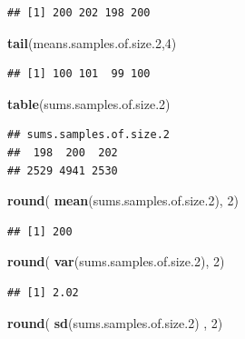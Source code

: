 \documentclass[]{book}
\newenvironment{Shaded}{\begin{snugshade}}{\end{snugshade}}
\newcommand{\DecValTok}[1]{\textcolor[rgb]{0.00,0.00,0.81}{#1}}
\newcommand{\FloatTok}[1]{\textcolor[rgb]{0.00,0.00,0.81}{#1}}
\newcommand{\KeywordTok}[1]{\textcolor[rgb]{0.13,0.29,0.53}{\textbf{#1}}}
\newcommand{\NormalTok}[1]{#1}
\begin{document}
\begin{verbatim}
## [1] 200 202 198 200
\end{verbatim}

\begin{Shaded}
\begin{Highlighting}[]
\KeywordTok{tail}\NormalTok{(means.samples.of.size}\FloatTok{.2}\NormalTok{,}\DecValTok{4}\NormalTok{)}
\end{Highlighting}
\end{Shaded}

\begin{verbatim}
## [1] 100 101  99 100
\end{verbatim}

\begin{Shaded}
\begin{Highlighting}[]
\KeywordTok{table}\NormalTok{(sums.samples.of.size}\FloatTok{.2}\NormalTok{)}
\end{Highlighting}
\end{Shaded}

\begin{verbatim}
## sums.samples.of.size.2
##  198  200  202 
## 2529 4941 2530
\end{verbatim}

\begin{Shaded}
\begin{Highlighting}[]
\KeywordTok{round}\NormalTok{( }\KeywordTok{mean}\NormalTok{(sums.samples.of.size}\FloatTok{.2}\NormalTok{), }\DecValTok{2}\NormalTok{)}
\end{Highlighting}
\end{Shaded}

\begin{verbatim}
## [1] 200
\end{verbatim}

\begin{Shaded}
\begin{Highlighting}[]
\KeywordTok{round}\NormalTok{( }\KeywordTok{var}\NormalTok{(sums.samples.of.size}\FloatTok{.2}\NormalTok{), }\DecValTok{2}\NormalTok{)}
\end{Highlighting}
\end{Shaded}

\begin{verbatim}
## [1] 2.02
\end{verbatim}

\begin{Shaded}
\begin{Highlighting}[]
\KeywordTok{round}\NormalTok{( }\KeywordTok{sd}\NormalTok{(sums.samples.of.size}\FloatTok{.2}\NormalTok{) , }\DecValTok{2}\NormalTok{)}
\end{Highlighting}
\end{Shaded}
\end{document}
